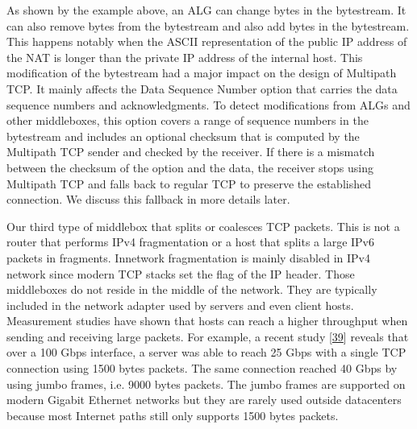 \documentclass[letterpaper,10pt,english]{sphinxmanual}
\begin{document}
\sphinxAtStartPar
As shown by the example above, an ALG can change bytes in the bytestream. It can also remove bytes from the bytestream and also add bytes in the bytestream. This happens notably when the ASCII representation of the public IP address of the NAT is longer than the private IP address of the internal host. This modification of the bytestream had a major impact on the design of Multipath TCP. It mainly affects the Data Sequence Number option that carries the data sequence numbers and acknowledgments. To detect modifications from ALGs and other middleboxes, this option covers a range of sequence numbers in the bytestream and includes an optional checksum that is computed by the Multipath TCP sender and checked by the receiver. If there is a mismatch between the checksum of the option and the data, the receiver stops using Multipath TCP and falls back to regular TCP to preserve the established connection. We discuss this fallback in more details later.

\sphinxAtStartPar
Our third type of middlebox that splits or coalesces TCP packets. This is not a router that performs IPv4 fragmentation or a host that splits a large IPv6 packets in fragments. In\sphinxhyphen{}network fragmentation is mainly disabled in IPv4 network since modern TCP stacks set the  flag of the IP header. Those middleboxes do not reside in the middle of the network. They are typically included in the network adapter used by servers and even client hosts. Measurement studies have shown that hosts can reach a higher throughput when sending and receiving large packets. For example, a recent study {[}\hyperlink{cite.biblio:id8923}{39}{]} reveals that over a 100 Gbps interface, a server was able to reach 25 Gbps with a single TCP connection using 1500 bytes packets. The same connection reached 40 Gbps by using jumbo frames, i.e. 9000 bytes packets. The jumbo frames are supported on modern Gigabit Ethernet networks but they are rarely used outside datacenters because most Internet paths still only supports 1500 bytes packets.
\end{document}

